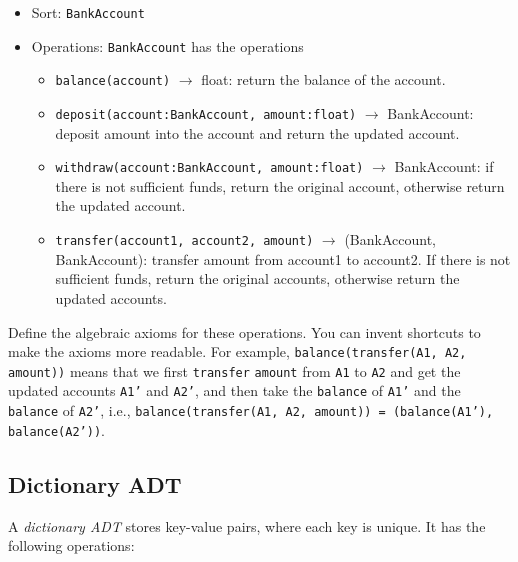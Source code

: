 \documentclass[oneside,11pt,dvipsnames]{book}
\newcommand{\code}[1]{\texttt{#1}}
\begin{document}
\begin{itemize}
    \item Sort: \code{BankAccount}
    \item Operations: \code{BankAccount} has the operations
    \begin{itemize}
        \item \code{balance(account)} $\rightarrow$ float: return the balance of the account.        
        \item \code{deposit(account:BankAccount, amount:float)} $\rightarrow$ BankAccount: deposit amount into the account and return the updated account.
        \item \code{withdraw(account:BankAccount, amount:float)} $\rightarrow$ BankAccount: if there is not sufficient funds, return the original account, otherwise return the updated account.        
        \item \code{transfer(account1, account2, amount)} $\rightarrow$ (BankAccount, BankAccount): transfer amount from account1 to account2. If there is not sufficient funds, return the original accounts, otherwise return the updated accounts.
    \end{itemize}
\end{itemize}    

Define the algebraic axioms for these operations. You can invent shortcuts to make the axioms more readable. For example, \code{balance(transfer(A1, A2, amount))} means that we first \code{transfer} \code{amount} from \code{A1} to \code{A2} and get the updated accounts \code{A1'} and \code{A2'}, and then take the \code{balance} of \code{A1'} and the \code{balance} of \code{A2'}, i.e., \code{balance(transfer(A1, A2, amount)) = (balance(A1'), balance(A2'))}.




\subsection{Dictionary ADT}\label{exercise:dictionary-adt}

A \emph{dictionary ADT} stores key-value pairs, where each key is unique. It has the following operations:
\end{document}
